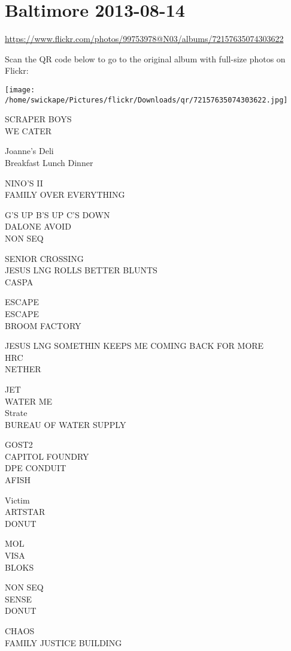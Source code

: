 \documentclass[10pt,letterpaper]{article}
\begin{document}
\section*{Baltimore 2013-08-14}

\url{https://www.flickr.com/photos/99753978@N03/albums/72157635074303622}

Scan the QR code below to go to the original album with full-size photos on Flickr:

\texttt{[image: /home/swickape/Pictures/flickr/Downloads/qr/72157635074303622.jpg]}
\pagebreak

SCRAPER BOYS\\
WE CATER

Joanne's Deli\\
Breakfast Lunch Dinner

NINO'S II\\
FAMILY OVER EVERYTHING

G'S UP B'S UP C'S DOWN\\
DALONE AVOID\\
NON SEQ

SENIOR CROSSING\\
JESUS LNG ROLLS BETTER BLUNTS\\
CASPA

ESCAPE\\
ESCAPE\\
BROOM FACTORY

JESUS LNG SOMETHIN KEEPS ME COMING BACK FOR MORE\\
HRC\\
NETHER

JET\\
WATER ME\\
Strate\\
BUREAU OF WATER SUPPLY

GOST2\\
CAPITOL FOUNDRY\\
DPE CONDUIT\\
AFISH

Victim\\
ARTSTAR\\
DONUT

MOL\\
VISA\\
BLOKS

NON SEQ\\
SENSE\\
DONUT

CHAOS\\
FAMILY JUSTICE BUILDING
\end{document}
